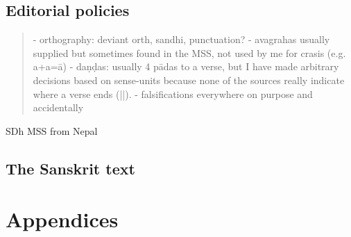 \documentclass[11pt]{book}
\begin{document}
\section{Editorial policies}

\begin{quote}
- orthography: deviant orth, sandhi, punctuation?
- avagrahas usually supplied but sometimes found in the MSS, not used by me for crasis (e.g. a+a=ā)
- daṇḍas: usually 4 pādas to a verse, but I have made arbitrary decisions based on sense-units 
  because none of the sources really indicate where a verse ends (||).
- falsifications everywhere on purpose and accidentally
\end{quote}

SDh MSS from Nepal



\vfill
\pagebreak




\section{The Sanskrit text}










%

\setcounter{page}{1000}
%










\chapter*{Appendices}
\end{document}

